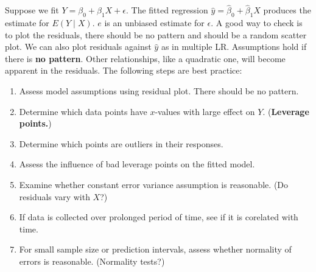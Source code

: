 \documentclass[12pt, a4paper]{article}
\theoremstyle{definition}
\newcommand{\eps}{\epsilon}
\begin{document}
		Suppose we fit $Y = \beta_0 + \beta_1 X + \eps$. The fitted regression $\hat y = \hat \beta_0 + \hat \beta_1 X$ produces the estimate for $E(Y \mid X)$. $e$ is an unbiased estimate for $\eps$. A good way to check is to plot the residuals, there should be no pattern and should be a random scatter plot. We can also plot residuals against $\hat y$ as in multiple LR. Assumptions hold if there is {\bf no pattern}. Other relationships, like a quadratic one, will become apparent in the residuals. The following steps are best practice:
		\begin{enumerate}
			\item Assess model assumptions using residual plot. There should be no pattern.
			\item Determine which data points have $x$-values with large effect on $Y$. ({\bf Leverage points.})
			\item Determine which points are outliers in their responses.
			\item Assess the influence of bad leverage points on the fitted model.
			\item Examine whether constant error variance assumption is reasonable. (Do residuals vary with $X$?)
			\item If data is collected over prolonged period of time, see if it is corelated with time.
			\item For small sample size or prediction intervals, assess whether normality of errors is reasonable. (Normality tests?)
		\end{enumerate}
		
		
		
		
			
	
		
		
\end{document}
